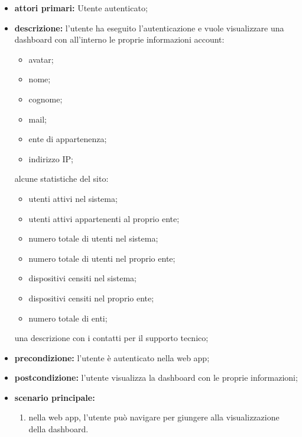 		\begin{itemize}
			\item \textbf{attori primari:} Utente autenticato;
			\item \textbf{descrizione:} l'utente ha eseguito l'autenticazione e vuole visualizzare una dashboard con all'interno le proprie informazioni account:
			\begin{itemize}
			 	\item avatar;
			 	\item nome;
			 	\item cognome;
			 	\item mail;
			 	\item ente di appartenenza;
			 	\item indirizzo IP;
			 \end{itemize}
			 alcune statistiche del sito:
			 \begin{itemize}
			  	\item utenti attivi nel sistema;
			  	\item utenti attivi appartenenti al proprio ente;
			   	\item numero totale di utenti nel sistema;
			   	\item numero totale di utenti nel proprio ente;
			   	\item dispositivi censiti nel sistema;
			   	\item dispositivi censiti nel proprio ente;
			   	\item numero totale di enti;
			 \end{itemize}
			 una descrizione con i contatti per il supporto tecnico;
			\item \textbf{precondizione:} l'utente è autenticato nella web app;
			\item \textbf{postcondizione:} l'utente visualizza la dashboard con le proprie informazioni;
			\item \textbf{scenario principale:}
			\begin{enumerate}
				\item nella web app, l'utente può navigare per giungere alla visualizzazione della dashboard.
			\end{enumerate}	
		\end{itemize}


